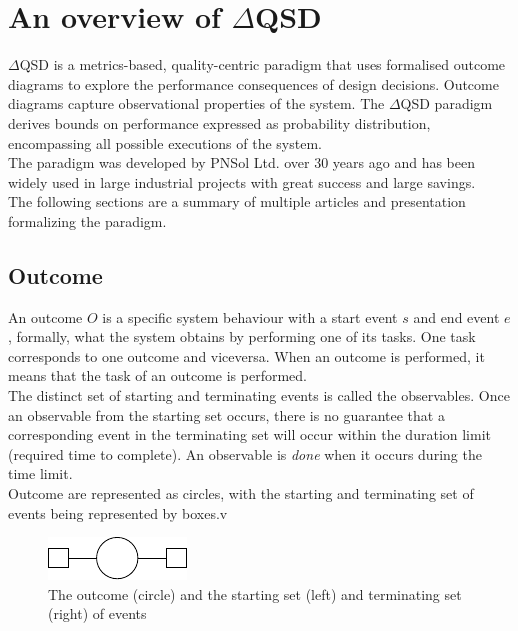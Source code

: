 \section{An overview of $\Delta$QSD}
    $\Delta$QSD is a metrics-based, quality-centric paradigm that uses formalised outcome diagrams to explore the performance consequences of design decisions. Outcome diagrams capture observational properties of the system. The $\Delta$QSD paradigm derives bounds on performance expressed as probability distribution, encompassing all possible executions of the system. \\
    The paradigm was developed by PNSol Ltd. over 30 years ago and has been widely used in large industrial projects with great success and large savings. \\
    The following sections are a summary of multiple articles and presentation formalizing the paradigm.
 
 \subsection{Outcome}
        An outcome $O$ is a specific system behaviour with a start event $s$ and end event $e$, formally, what the system obtains by performing one of its tasks. One task corresponds to one outcome and viceversa. When an outcome is performed, it means that the task of an outcome is performed. \\
    The distinct set of starting and terminating events is called the observables. Once an observable from the starting set occurs, there is no guarantee that a corresponding event in the terminating set will occur within the duration limit (required time to complete). An observable is \textit{done}  when it occurs during the time limit. \\
    Outcome are represented as circles, with the starting and terminating set of events being represented by boxes.v
    \begin{figure}[H]
        \begin{center}
            \includegraphics[scale=1.3]{tikz/outcome.pdf}
        \end{center}
        \caption{The outcome (circle) and the starting set (left) and terminating set (right) of events}
    \end{figure}

